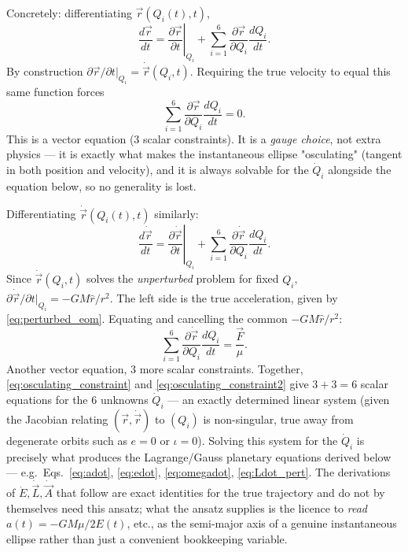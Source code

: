 \documentclass[11pt]{article}
\newcommand{\vecr}{\vec r}
\newcommand{\vecL}{\vec L}
\newcommand{\vecA}{\vec A}
\newcommand{\vecF}{\vec F}
\newcommand{\rhat}{\hat r}
\begin{document}
Concretely: differentiating $\vecr(Q_i(t),t)$,
\begin{equation}
\frac{d\vecr}{dt}=\left.\frac{\partial\vecr}{\partial t}\right|_{Q_i}+\sum_{i=1}^6\frac{\partial\vecr}{\partial Q_i}\frac{dQ_i}{dt}.
\end{equation}
By construction $\partial\vecr/\partial t|_{Q_i}=\dot{\vecr}(Q_i,t)$. Requiring the true velocity to equal this same function forces
\begin{equation}
\sum_{i=1}^{6}\frac{\partial\vecr}{\partial Q_i}\frac{dQ_i}{dt}=0. \label{eq:osculating_constraint}
\end{equation}
This is a vector equation ($3$ scalar constraints). It is a \emph{gauge choice}, not extra physics — it is exactly what makes the instantaneous ellipse "osculating" (tangent in both position and velocity), and it is always solvable for the $\dot Q_i$ alongside the equation below, so no generality is lost.

Differentiating $\dot{\vecr}(Q_i(t),t)$ similarly:
\[
\frac{d\dot{\vecr}}{dt}=\left.\frac{\partial\dot{\vecr}}{\partial t}\right|_{Q_i}+\sum_{i=1}^6\frac{\partial\dot{\vecr}}{\partial Q_i}\frac{dQ_i}{dt}.
\]
Since $\dot{\vecr}(Q_i,t)$ solves the \emph{unperturbed} problem for fixed $Q_i$, $\partial\dot{\vecr}/\partial t|_{Q_i}=-GM\rhat/r^2$. The left side is the true acceleration, given by \eqref{eq:perturbed_eom}. Equating and cancelling the common $-GM\rhat/r^2$:
\begin{equation}
\sum_{i=1}^{6}\frac{\partial\dot{\vecr}}{\partial Q_i}\frac{dQ_i}{dt}=\frac{\vecF}{\mu}. \label{eq:osculating_constraint2}
\end{equation}
Another vector equation, $3$ more scalar constraints. Together, \eqref{eq:osculating_constraint} and \eqref{eq:osculating_constraint2} give $3+3=6$ scalar equations for the $6$ unknowns $\dot Q_i$ — an exactly determined linear system (given the Jacobian relating $(\vecr,\dot{\vecr})$ to $(Q_i)$ is non-singular, true away from degenerate orbits such as $e=0$ or $\iota=0$). Solving this system for the $\dot Q_i$ is precisely what produces the Lagrange/Gauss planetary equations derived below — e.g.\ Eqs.~\eqref{eq:adot}, \eqref{eq:edot}, \eqref{eq:omegadot}, \eqref{eq:Ldot_pert}. The derivations of $\dot E,\dot{\vecL},\dot{\vecA}$ that follow are exact identities for the true trajectory and do not by themselves need this ansatz; what the ansatz supplies is the licence to \emph{read} $a(t)=-GM\mu/2E(t)$, etc., as the semi-major axis of a genuine instantaneous ellipse rather than just a convenient bookkeeping variable.
\end{document}
